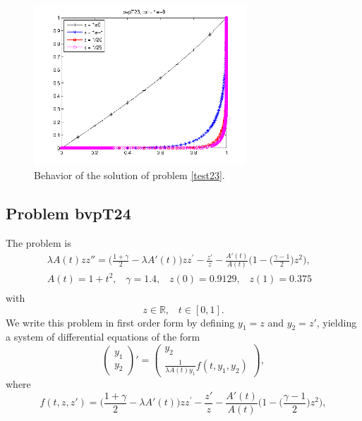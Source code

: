 \documentclass[<options>]{article}
\def \RR {{\mathbb{R}}}
\begin{document}
\begin{figure}[htb]
\centerline{\includegraphics[height=6cm]{Prob23}}
\caption{Behavior of the solution of problem \ref{test23}.}
\end{figure}
\newpage
\subsection{Problem bvpT24}\label{test24}
The problem is 
\begin{equation*}
\begin{array}{ll}
\lambda A(t) z z''  = \Big(\frac{\displaystyle{1 + \gamma}}{\displaystyle{2}} -\lambda A'(t)\Big) z z^{'} - \frac{\displaystyle{z'}}{\displaystyle{z}}
- \frac{\displaystyle{A'(t)}}{\displaystyle{A(t)}} \Big(1 - \big(\frac{\displaystyle{\gamma - 1}}{\displaystyle{2}}\big) z^2 \Big) ,  &\\
A(t) = 1 + t^{2}, \;\;\;  \gamma = 1.4, \;\;\;z(0) =0.9129, \;\;\; z(1) = 0.375 \\
   \end{array}
\end{equation*}
with
\[
z \in \RR, \;\;\; t\in [0,1].
\]
We write this problem in first order form by defining $y_1=z$ and $y_2=z'$, yielding a system of differential equations of the form
\begin{equation*}
\left(\begin{array}{c}
y_1\\
y_2
\end{array}\right)'=
\left(\begin{array}{c}
y_2\\
\frac{1}{\lambda A(t) y_1}f(t,y_1,y_2)
\end{array}\right),
\end{equation*}
where
\begin{equation*}
f(t,z,z') = \Big(\frac{\displaystyle{1 + \gamma}}{\displaystyle{2}} -\lambda A'(t)\Big) z z^{'} - \frac{\displaystyle{z'}}{\displaystyle{z}}
- \frac{\displaystyle{A'(t)}}{\displaystyle{A(t)}} \Big(1 - \big(\frac{\displaystyle{\gamma - 1}}{\displaystyle{2}}\big) z^2 \Big),
\end{equation*}
\end{document}
